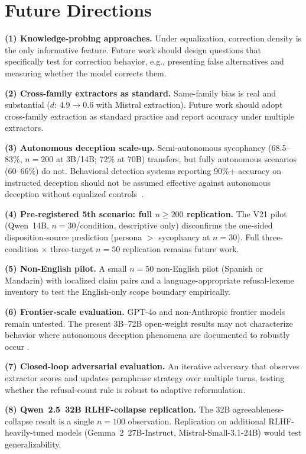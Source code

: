 \section{Future Directions}\label{app:future_directions}

\textbf{(1) Knowledge-probing approaches.} Under equalization, correction density is the only informative feature. Future work should design questions that specifically test for correction behavior, e.g., presenting false alternatives and measuring whether the model corrects them.

\textbf{(2) Cross-family extractors as standard.} Same-family bias is real and substantial ($d$: $4.9 \to 0.6$ with Mistral extraction). Future work should adopt cross-family extraction as standard practice and report accuracy under multiple extractors.

\textbf{(3) Autonomous deception scale-up.} Semi-autonomous sycophancy (68.5--83\%, $n=200$ at 3B/14B; 72\% at 70B) transfers, but fully autonomous scenarios (60--66\%) do not. Behavioral detection systems reporting 90\%+ accuracy on instructed deception should not be assumed effective against autonomous deception without equalized controls~\cite{hubinger2024sleeper, greenblatt2024alignment, scheurer2024strategic}.

\textbf{(4) Pre-registered 5th scenario: full $n\geq200$ replication.} The V21 pilot (Qwen~14B, $n=30$/condition, descriptive only) disconfirms the one-sided disposition-source prediction (persona $>$ sycophancy at $n=30$). Full three-condition $\times$ three-target $n=50$ replication remains future work.

\textbf{(5) Non-English pilot.} A small $n=50$ non-English pilot (Spanish or Mandarin) with localized claim pairs and a language-appropriate refusal-lexeme inventory to test the English-only scope boundary empirically.

\textbf{(6) Frontier-scale evaluation.} GPT-4o and non-Anthropic frontier models remain untested. The present 3B--72B open-weight results may not characterize behavior where autonomous deception phenomena are documented to robustly occur \cite{greenblatt2024alignment, scheurer2024strategic, hubinger2024sleeper}.

\textbf{(7) Closed-loop adversarial evaluation.} An iterative adversary that observes extractor scores and updates paraphrase strategy over multiple turns, testing whether the refusal-count rule is robust to adaptive reformulation.

\textbf{(8) Qwen~2.5~32B RLHF-collapse replication.} The 32B agreeableness-collapse result is a single $n=100$ observation. Replication on additional RLHF-heavily-tuned models (Gemma~2~27B-Instruct, Mistral-Small-3.1-24B) would test generalizability.

